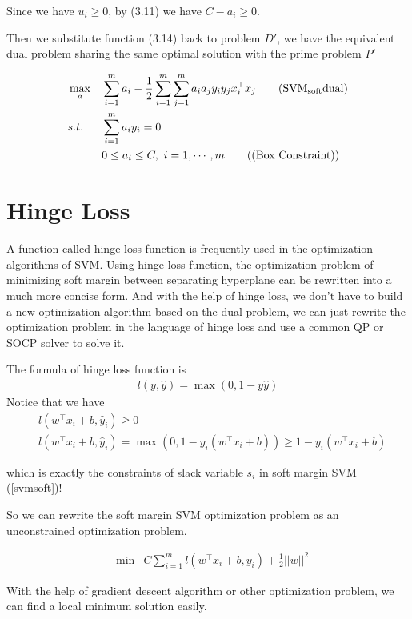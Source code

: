 \documentclass[a4paper]{report}
\begin{document}
Since we have $u_i\geq 0$, by (3.11) we have $C-a_i\geq 0$.

Then we substitute function (3.14) back to problem $D'$, we have the equivalent dual problem sharing the same optimal solution with the prime problem $P'$

\begin{align*}
    &\max_a & & \sum_{i=1}^m a_i - \frac{1}{2} \sum_{i=1}^m\sum_{j=1}^m a_i a_j y_i y_j x_i^\top x_j \label{softsvmd}\tag{$\mathrm{SVM_{soft} dual}$}\\
    &s.t. \ & & \sum_{i=1}^m a_i y_i=0 \\
    & & & 0\leq a_i \leq C,\ i=1,\cdots,m \tag{(Box Constraint)}
\end{align*}

\section{Hinge Loss}

A function called hinge loss function is frequently used in the optimization algorithms of SVM. Using hinge loss function, the optimization problem of minimizing soft margin between separating hyperplane can be rewritten into a much more concise form. And with the help of hinge loss, we don't have to build a new optimization algorithm based on the dual problem, we can just rewrite the optimization problem in the language of hinge loss and use a common QP or SOCP solver to solve it.

The formula of hinge loss function is
\begin{align}
    l(y,\hat y)=\max(0,1-y\hat y)
\end{align}
Notice that we have
\begin{align}
    &l(w^\top x_i+b,\hat y_i) \geq 0 \\
    &l(w^\top x_i+b,\hat y_i) =\max(0,1-y_i(w^\top x_i+b))\geq 1-y_i(w^\top x_i+b)
\end{align}

which is exactly the constraints of slack variable $s_i$ in soft margin SVM (\ref{svmsoft})!

So we can rewrite the soft margin SVM optimization problem as an unconstrained optimization problem.

\begin{align*}
    &\min & C \sum_{i=1}^m l(w^\top x_i+b, y_i) + \frac{1}{2}||w||^2 
\end{align*}

With the help of gradient descent algorithm or other optimization problem, we can find a local minimum solution easily.
\end{document}
